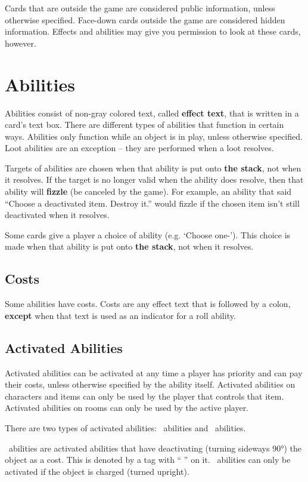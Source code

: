 \documentclass[
  fontsize=10pt,
  paper=a5,
  version=last,
  chapterprefix=true,
  bindingoffset=5mm,
  ]{scrbook}
\newcommand*{\inlineicon}[1]{%
    \raisebox{-.3\baselineskip}{%
        \smash{%
            \texttt{[image: \#1]}%
        }%
    }%
}
\newcommand{\tap}{\inlineicon{./assets/ms-tap.png}}
\newcommand{\pay}{\inlineicon{./assets/ms-paid.png}}
\begin{document}
    Cards that are outside the game are considered public information, unless otherwise specified. Face-down cards outside the game are considered hidden information. Effects and abilities may give you permission to look at these cards, however.

    \chapter{Abilities}
    \label{abilities}
    Abilities consist of non-gray colored text, called \textbf{effect text}, that is written in a card’s text box. There are different types of abilities that function in certain ways. Abilities only function while an object is in play, unless otherwise specified. Loot abilities are an exception – they are performed when a loot resolves.

    Targets of abilities are chosen when that ability is put onto \textbf{the stack}, not when it resolves. If the target is no longer valid when the ability does resolve, then that ability will \textbf{fizzle} (be canceled by the game). For example, an ability that said “Choose a deactivated item. Destroy it.” would fizzle if the chosen item isn’t still deactivated when it resolves.

    Some cards give a player a choice of ability (e.g. ‘Choose one-’). This choice is made when that ability is put onto \textbf{the stack}, not when it resolves.

    \section{Costs}
    Some abilities have costs. Costs are any effect text that is followed by a colon, \textbf{except} when that text is used as an indicator for a roll ability.

    \section{Activated Abilities}
    Activated abilities can be activated at any time a player has priority and can pay their costs, unless otherwise specified by the ability itself. Activated abilities on characters and items can only be used by the player that controls that item. Activated abilities on rooms can only be used by the active player.

    There are two types of activated abilities: \tap\ abilities and \pay\ abilities.
    
    \tap\ abilities are activated abilities that have deactivating (turning sideways 90°) the object as a cost. This is denoted by a tag with “\tap” on it. \tap\ abilities can only be activated if the object is charged (turned upright).
    
\end{document}
